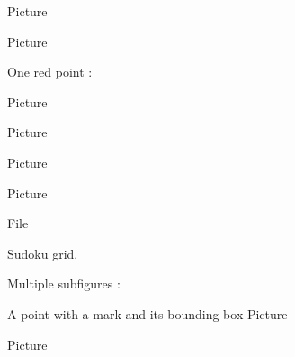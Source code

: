 Picture 
\begin{center}
   
\end{center}
   

Picture 
   \begin{center}
       
   \end{center}
       


One red point :

Picture 
\begin{center}
   
\end{center}

Picture 
\begin{center}

\end{center}


Picture 
\begin{center}

\end{center}




Picture 
\begin{center}

\end{center}


File 
\begin{center}
   
\end{center}
   

Sudoku grid.

\begin{center}
   
\end{center}
   

   \clearpage

Multiple subfigures :

A point with a mark and its bounding box
Picture 
\Huge

\begin{center}
   
\end{center}
\normalsize


Picture 
\begin{center}
   
\end{center}
   

